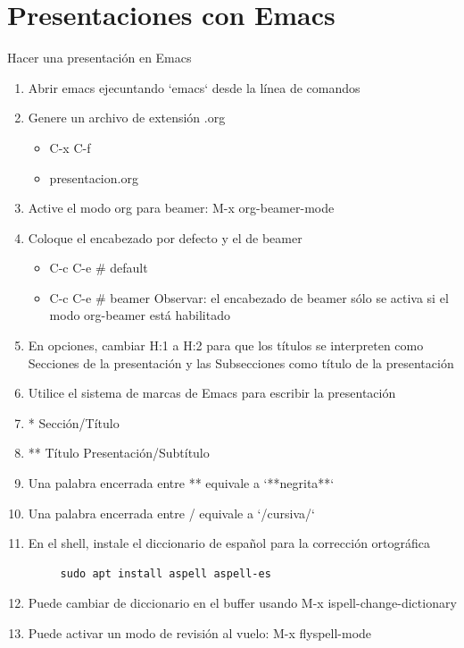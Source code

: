 \documentclass[presentation]{beamer}
\begin{document}
\section{Presentaciones con Emacs}
\label{sec:orgc5d0ba6}
\begin{frame}{Hacer una presentación en Emacs}
 \begin{enumerate}
\item Abrir emacs ejecuntando `emacs` desde la línea de comandos
\item Genere un archivo de extensión .org
\begin{itemize}
\item C-x C-f
\item presentacion.org
\end{itemize}
\item Active el modo org para beamer: M-x org-beamer-mode
\item Coloque el encabezado por defecto y el de beamer
\begin{itemize}
\item C-c C-e \# default
\item C-c C-e \# beamer
\alert{\alert{Observar:}} el encabezado de beamer sólo se
activa si el \alert{\alert{modo org-beamer}} está habilitado
\end{itemize}
\item En opciones, cambiar H:1 a H:2 para que los títulos se interpreten
como Secciones de la presentación y las Subsecciones como título de
la presentación
\item Utilice el sistema de marcas de Emacs para escribir la presentación
\item * Sección/Título
\item ** Título Presentación/Subtítulo
\item Una palabra encerrada entre ** equivale a `**negrita**`
\item Una palabra encerrada entre / equivale a `/cursiva/`
\item En el shell, instale el diccionario de español para la corrección ortográfica
\begin{verbatim}
     sudo apt install aspell aspell-es
\end{verbatim}
\item Puede cambiar de diccionario en el buffer usando M-x ispell-change-dictionary
\item Puede activar un modo de revisión al vuelo: M-x flyspell-mode
\end{enumerate}
\end{frame}
\end{document}
